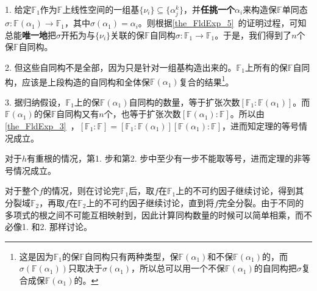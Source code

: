 1. 给定$\mathbb{F}_1$作为$\mathbb{F}$上线性空间的一组基$\{\nu_i\}\subseteq\{\alpha_j^k\}$，并\textbf{任挑一个}$\alpha_i$来构造保$\mathbb{F}$单同态$\sigma: \mathbb{F}(\alpha_1)\to\mathbb{F}_1$，其中$\sigma(\alpha_1)=\alpha_i$。则根据\autoref{the_FldExp_5}~的证明过程，可知总能\textbf{唯一地}把$\sigma$开拓为与$\{\nu_i\}$关联的保$\mathbb{F}$自同构$\sigma: \mathbb{F}_1\to\mathbb{F}_1$。于是，我们得到了$n$个保$\mathbb{F}$自同构。

2. 但这些自同构不是全部，因为只是针对一组基构造出来的。$\mathbb{F}_1$上所有的保$\mathbb{F}$自同构，应该是上段构造的自同构和全体保$\mathbb{F}(\alpha_1)$复合的结果\footnote{这是因为$\mathbb{F}_1$的保$\mathbb{F}$自同构只有两种类型，保$\mathbb{F}(\alpha_1)$和不保$\mathbb{F}(\alpha_1)$的，而$\sigma(\mathbb{F}(\alpha_1))$只取决于$\sigma(\alpha_1)$，所以总可以用一个不保$\mathbb{F}(\alpha_1)$的自同构把$\sigma$复合成保$\mathbb{F}(\alpha_1)$的。}。

3. 据归纳假设，$\mathbb{F}_1$上的保$\mathbb{F}(\alpha_1)$自同构的数量，等于扩张次数$[\mathbb{F}_1:\mathbb{F}(\alpha_1)]$。而$\mathbb{F}(\alpha_1)$的保$\mathbb{F}$自同构又有$n$个，也等于扩张次数$[\mathbb{F}(\alpha_1):\mathbb{F}]$。所以由\autoref{the_FldExp_3}~，$[\mathbb{F}_1:\mathbb{F}]=[\mathbb{F}_1:\mathbb{F}(\alpha_1)][\mathbb{F}(\alpha_1):\mathbb{F}]$，进而知定理的等号情况成立。

对于$h$有重根的情况，第1. 步和第2. 步中至少有一步不能取等号，进而定理的非等号情况成立。

对于整个$f$的情况，则在讨论完$\mathbb{F}_1$后，取$f$在$\mathbb{F}_1$上的不可约因子继续讨论，得到其分裂域$\mathbb{F}_2$，再取$f$在$\mathbb{F}_2$上的不可约因子继续讨论，直到将$f$完全分裂。由于不同的多项式的根之间不可能互相映射到，因此计算同构数量的时候可以简单相乘，而不必像1. 和2. 那样讨论。









